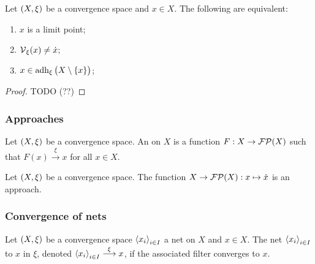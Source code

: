 \begin{proposition}
Let $\sSet{X,\xi}$ be a convergence space and $x\in X$. The following are equivalent:
\begin{enumerate}
\item $x$ is a limit point;
\item $\operatorname{\mathcal{V}}_\xi(x) \neq \dot{x}$;
\item $x\in \operatorname{adh}_\xi\big(X\setminus\{x\}\big)$;
\end{enumerate}
\end{proposition}
\begin{proof}
TODO (??)
\end{proof}

\subsubsection{Approaches}
\begin{definition}
Let $\sSet{X,\xi}$ be a convergence space. An  on $X$ is a function $F: X\to \operatorname{\mathcal{FP}}(X)$ such that $F(x) \overset{\xi}{\longrightarrow} x$ for all $x\in X$.
\end{definition}

\begin{lemma}
Let $\sSet{X,\xi}$ be a convergence space. The function $X\to \operatorname{\mathcal{FP}}(X): x\mapsto \dot{x}$ is an approach.
\end{lemma}



\subsubsection{Convergence of nets}
\begin{definition}
Let $\sSet{X,\xi}$ be a convergence space $\left\langle x_i \right\rangle_{i\in I}$ a net on $X$ and $x\in X$. The net $\left\langle x_i \right\rangle_{i\in I}$  to $x$ in $\xi$, denoted $\left\langle x_i \right\rangle_{i\in I} \overset{\xi}{\longrightarrow} x$, if the associated filter converges to $x$.
\end{definition}


